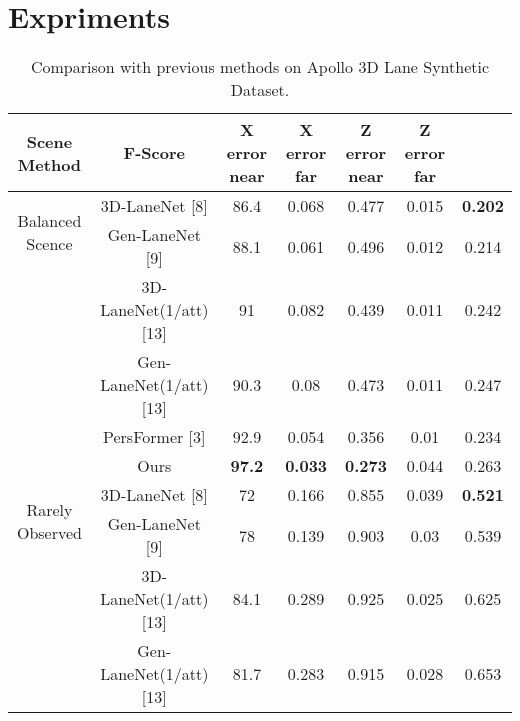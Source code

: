 \section{Expriments}

\begin{table*}[!ht]
    \caption{Comparison with previous methods on Apollo 3D Lane Synthetic Dataset.}\label{tab:table1}
    \center
    \begin{tabular}{ccccccc}%
        \toprule %
        Scene Method & F-Score & X error near & X error far & Z error near & Z error far \\
        \toprule %
        \multirow{2}{*}{Balanced Scence} & 3D-LaneNet [8] & 86.4 & 0.068 & 0.477 & 0.015 & \textbf{0.202} \\ %
        \multirow{2}{*}{ }               & Gen-LaneNet [9] & 88.1 & 0.061 & 0.496 & 0.012 & 0.214  \\
        \multirow{2}{*}{ }               & 3D-LaneNet(1/att) [13] & 91 & 0.082 & 0.439 & 0.011 & 0.242  \\
        \multirow{2}{*}{ }               & Gen-LaneNet(1/att) [13] & 90.3 & 0.08 & 0.473 & 0.011 & 0.247  \\
        \multirow{2}{*}{ }               & PersFormer [3] & 92.9 & 0.054 & 0.356 & 0.01  & 0.234 \\
        \multirow{2}{*}{ }               & Ours       & \textbf{97.2} & \textbf{0.033} & \textbf{0.273} & 0.044 & 0.263 \\
        \midrule %
        \multirow{2}{*}{Rarely Observed} & 3D-LaneNet [8] & 72 & 0.166 & 0.855 & 0.039 & \textbf{0.521} \\
        \multirow{2}{*}{ }               & Gen-LaneNet [9] & 78 & 0.139 & 0.903 & 0.03 & 0.539  \\
        \multirow{2}{*}{ }               & 3D-LaneNet(1/att) [13] & 84.1 & 0.289 & 0.925 & 0.025 & 0.625  \\
        \multirow{2}{*}{ }               & Gen-LaneNet(1/att) [13] & 81.7 & 0.283 & 0.915 & 0.028 & 0.653  \\

\end{tabular}
\end{table*}
